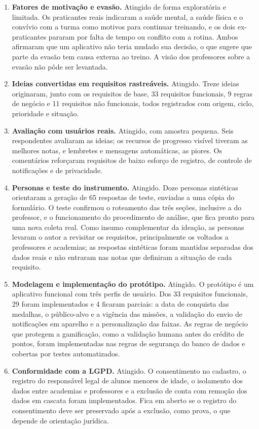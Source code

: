 \begin{enumerate}
  \item \textbf{Fatores de motivação e evasão.} Atingido de forma
        exploratória e limitada. Os praticantes reais indicaram a saúde
        mental, a saúde física e o convívio com a turma como motivos para
        continuar treinando, e os dois ex-praticantes pararam por falta de
        tempo ou conflito com a rotina. Ambos afirmaram que um aplicativo
        não teria mudado sua decisão, o que sugere que parte da evasão tem
        causa externa ao treino. A visão dos professores sobre a evasão não
        pôde ser levantada.
  \item \textbf{Ideias convertidas em requisitos rastreáveis.} Atingido.
        Treze ideias originaram, junto com os requisitos de base, 33
        requisitos funcionais, 9 regras de negócio e 11 requisitos não
        funcionais, todos registrados com origem, ciclo, prioridade e
        situação.
  \item \textbf{Avaliação com usuários reais.} Atingido, com amostra
        pequena. Seis respondentes avaliaram as ideias; os recursos de
        progresso visível tiveram as melhores notas, e lembretes e
        mensagens automáticas, as piores. Os comentários reforçaram
        requisitos de baixo esforço de registro, de controle de
        notificações e de privacidade.
  \item \textbf{Personas e teste do instrumento.} Atingido. Doze personas
        sintéticas orientaram a geração de 65 respostas de teste, enviadas
        a uma cópia do formulário. O teste confirmou o roteamento das três
        seções, inclusive a do professor, e o funcionamento do procedimento
        de análise, que fica pronto para uma nova coleta real. Como insumo
        complementar da ideação, as personas levaram o autor a revisitar
        os requisitos, principalmente os voltados a professores e
        academias; as respostas sintéticas foram mantidas separadas dos
        dados reais e não entraram nas notas que definiram a situação de
        cada requisito.
  \item \textbf{Modelagem e implementação do protótipo.} Atingido. O
        protótipo é um aplicativo funcional com três perfis de usuário. Dos
        33 requisitos funcionais, 29 foram implementados e 4 ficaram
        parciais: a data de conquista das medalhas, o público-alvo e a
        vigência das missões, a validação do envio de notificações em
        aparelho e a personalização das faixas. As regras de negócio que protegem a gamificação,
        como a validação humana antes do crédito de pontos, foram
        implementadas nas regras de segurança do banco de dados e
        cobertas por testes automatizados.
  \item \textbf{Conformidade com a LGPD.} Atingido. O consentimento no
        cadastro, o registro do responsável legal de alunos menores de
        idade, o isolamento dos dados entre academias e professores e a
        exclusão de conta com remoção dos dados em cascata foram
        implementados. Fica em aberto se o registro do consentimento deve
        ser preservado após a exclusão, como prova, o que depende de
        orientação jurídica.
\end{enumerate}

